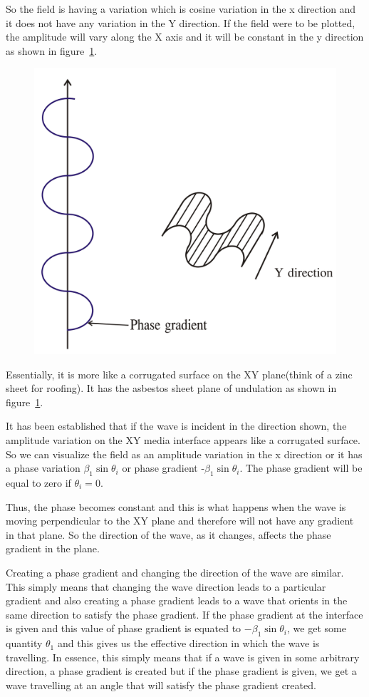 So the field is having a variation which is cosine variation in the x direction and it does not have any variation in the Y direction. If the field were to be plotted, the amplitude will vary along the X axis and it will be constant in the y direction as shown in figure~\ref{fig:group30c}.
\begin{figure}[h]
\centering
\includegraphics[width=.7\linewidth]{graphics/group30c}
\caption{}
\label{fig:group30c}
\end{figure}

Essentially, it is more like a corrugated surface on the XY plane(think of a zinc sheet for roofing). It has the asbestos sheet plane of undulation as shown in figure~\ref{fig:group30c}.

It has been established that if the wave is incident in the direction shown, the amplitude variation on the XY media interface appears like a corrugated surface. So we can visualize the field as an amplitude variation in the x direction or it has a phase variation $\beta_1\sin \theta_i$ or phase gradient -$\beta_1\sin\theta_i$. The phase gradient will be equal to zero if $\theta_i=0$.

Thus, the phase becomes constant and this is what happens when the wave is moving perpendicular to the XY plane and therefore will not have any gradient in that plane. So the direction of the wave, as it changes, affects the phase gradient in the plane.

Creating a phase gradient and changing the direction of the wave are similar. This simply means that changing the wave direction leads to a particular gradient and also creating a phase gradient leads to a wave that orients in the same direction to satisfy the phase gradient. If the phase gradient at the interface is given and this value of phase gradient is equated to $-\beta_1 \sin \theta_i$, we get some quantity $\theta_1$ and this gives us the effective direction in which the wave is travelling. In essence, this simply means that if a wave is given in some arbitrary direction, a phase gradient is created but if the phase gradient is given, we get a wave travelling at an angle that will satisfy the phase gradient created.

